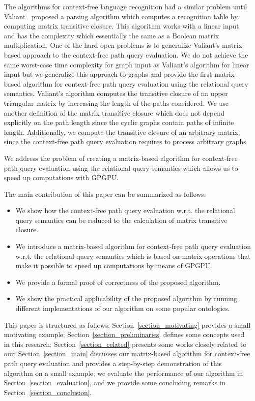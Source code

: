 The algorithms for context-free language recognition had a similar problem until Valiant~\cite{valiant} proposed a parsing algorithm which computes a recognition table by computing matrix transitive closure. This algorithm works with a linear input and has the complexity which essentially the same as a Boolean matrix multiplication. One of the hard open problems is to generalize Valiant's matrix-based approach to the context-free path query evaluation. We do not achieve the same worst-case time complexity for graph input as Valiant's algorithm for linear input but we generalize this approach to graphs and provide the first matrix-based algorithm for context-free path query evaluation using the relational query semantics. Valiant's algorithm computes the transitive closure of an upper triangular matrix by increasing the length of the paths considered. We use another definition of the matrix transitive closure which does not depend explicitly on the path length since the cyclic graphs contain paths of infinite length. Additionally, we compute the transitive closure of an arbitrary matrix, since the context-free path query evaluation requires to process arbitrary graphs.

We address the problem of creating a matrix-based algorithm for context-free path query evaluation using the relational query semantics which allows us to speed up computations with GPGPU.

The main contribution of this paper can be summarized as follows:
\begin{itemize}
	\item We show how the context-free path query evaluation w.r.t. the relational query semantics can be reduced to the calculation of matrix transitive closure.
	\item We introduce a matrix-based algorithm for context-free path query evaluation w.r.t. the relational query semantics which is based on matrix operations that make it possible to speed up computations by means of GPGPU.
	\item We provide a formal proof of correctness of the proposed algorithm.
	\item We show the practical applicability of the proposed algorithm by running different implementations of our algorithm on some popular ontologies.
\end{itemize}

This paper is structured as follows: Section~\ref{section_motivating} provides a small motivating example; Section~\ref{section_preliminaries} defines some concepts used in this research; Section~\ref{section_related} presents some works closely related to our; Section~\ref{section_main} discusses our matrix-based algorithm for context-free path query evaluation and provides a step-by-step demonstration of this algorithm on a small example;  we evaluate the performance of our algorithm in Section~\ref{section_evaluation}, and we provide some concluding remarks in Section~\ref{section_conclusion}.
